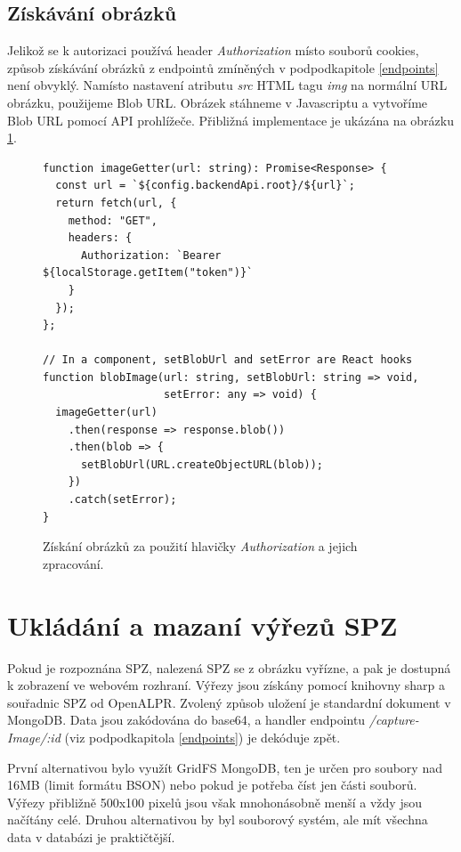\subsection{Získávání obrázků}

\noindent
Jelikož se k autorizaci používá header \textit{Authorization} místo souborů cookies,
způsob získávání obrázků z endpointů zmíněných v podpodkapitole \ref{endpoints} není obvyklý.
Namísto nastavení atributu \textit{src} HTML tagu \textit{img} na normální URL obrázku,
použijeme Blob URL. Obrázek stáhneme v Javascriptu a vytvoříme Blob URL pomocí API prohlížeče.
Přibližná implementace je ukázána na obrázku \ref{fig:image_getter}.

\begin{figure}[!htb]
\lstset{language=Javascript}
\begin{lstlisting}
function imageGetter(url: string): Promise<Response> {
  const url = `${config.backendApi.root}/${url}`;
  return fetch(url, {
    method: "GET",
    headers: {
      Authorization: `Bearer ${localStorage.getItem("token")}`
    }
  });
};

// In a component, setBlobUrl and setError are React hooks
function blobImage(url: string, setBlobUrl: string => void,
                   setError: any => void) {
  imageGetter(url)
    .then(response => response.blob())
    .then(blob => {
      setBlobUrl(URL.createObjectURL(blob));
    })
    .catch(setError);
}
\end{lstlisting}
\caption{Získání obrázků za použití hlavičky \textit{Authorization} a jejich zpracování.}
\label{fig:image_getter}
\end{figure}

\section{Ukládání a mazaní výřezů SPZ}

\noindent
Pokud je rozpoznána SPZ, nalezená SPZ se z obrázku vyřízne, a pak je dostupná k zobrazení ve webovém rozhraní.
Výřezy jsou získány pomocí knihovny sharp a souřadnic SPZ od OpenALPR.
Zvolený způsob uložení je standardní dokument v MongoDB. Data jsou zakódována do base64,
a handler endpointu \textit{/capture-Image/:id} (viz podpodkapitola \ref{endpoints}) je dekóduje zpět.

První alternativou bylo využít GridFS MongoDB, ten je určen pro soubory
nad 16MB (limit formátu BSON) nebo pokud je potřeba číst jen části souborů. \citep{MongoDBGridFS}
Výřezy přibližně 500x100 pixelů jsou však mnohonásobně menší a vždy jsou načítány celé.
Druhou alternativou by byl souborový systém, ale mít všechna data v databázi je praktičtější.

